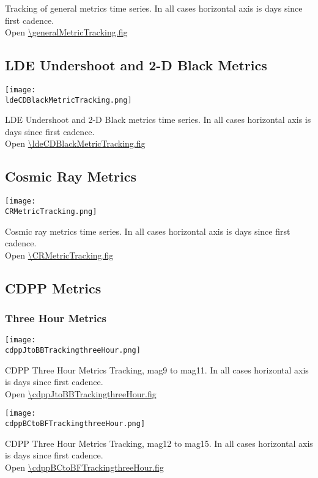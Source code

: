 Tracking of general metrics time series. In all cases horizontal axis
is days since first cadence.\\
Open \url{\generalMetricTracking.fig}

\clearpage
\subsection{LDE Undershoot and 2-D Black Metrics}

\begin{center}
\texttt{[image: \\ldeCDBlackMetricTracking.png]}
\end{center}
LDE Undershoot and 2-D Black metrics time series. In all cases
horizontal axis is days since first cadence.\\
Open \url{\ldeCDBlackMetricTracking.fig}

\clearpage
\subsection{Cosmic Ray Metrics}

\begin{center}
\texttt{[image: \\CRMetricTracking.png]}
\end{center}
Cosmic ray metrics time series. In all cases horizontal axis is days
since first cadence.\\ 
Open \url{\CRMetricTracking.fig}

\clearpage
\subsection{CDPP Metrics}

\subsubsection{Three Hour Metrics}

\begin{center}
\texttt{[image: \\cdppJtoBBTrackingthreeHour.png]}
\end{center}
CDPP Three Hour Metrics Tracking, mag9 to mag11. In all cases
horizontal axis is days since first cadence.\\
Open \url{\cdppJtoBBTrackingthreeHour.fig}

\clearpage
\begin{center}
\texttt{[image: \\cdppBCtoBFTrackingthreeHour.png]}
\end{center}
CDPP Three Hour Metrics Tracking, mag12 to mag15. In all cases
horizontal axis is days since first cadence.\\
Open \url{\cdppBCtoBFTrackingthreeHour.fig}

